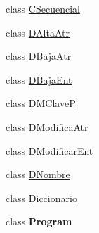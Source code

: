 \begin{DoxyCompactItemize}
\item 
class \hyperlink{class_diccionario_1_1_c_secuencial}{C\-Secuencial}
\item 
class \hyperlink{class_diccionario_1_1_d_alta_atr}{D\-Alta\-Atr}
\item 
class \hyperlink{class_diccionario_1_1_d_baja_atr}{D\-Baja\-Atr}
\item 
class \hyperlink{class_diccionario_1_1_d_baja_ent}{D\-Baja\-Ent}
\item 
class \hyperlink{class_diccionario_1_1_d_m_clave_p}{D\-M\-Clave\-P}
\item 
class \hyperlink{class_diccionario_1_1_d_modifica_atr}{D\-Modifica\-Atr}
\item 
class \hyperlink{class_diccionario_1_1_d_modificar_ent}{D\-Modificar\-Ent}
\item 
class \hyperlink{class_diccionario_1_1_d_nombre}{D\-Nombre}
\item 
class \hyperlink{class_diccionario_1_1_diccionario}{Diccionario}
\item 
class {\bfseries Program}
\end{DoxyCompactItemize}
